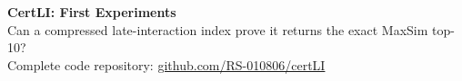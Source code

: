 \documentclass[10pt]{article}
\begin{document}
\begin{center}
{\LARGE\bfseries\color{ink} CertLI: First Experiments}\\[3pt]
{\large Can a compressed late-interaction index prove it returns the exact MaxSim top-10?}\\[6pt]
{\small Complete code repository: \href{https://github.com/RS-010806/certLI}{github.com/RS-010806/certLI}}
\end{center}


\end{document}
